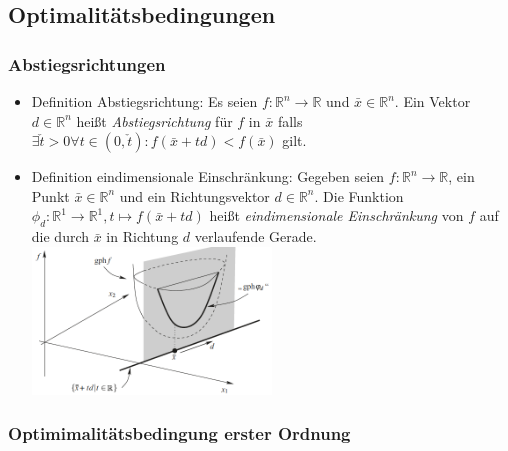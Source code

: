 \documentclass[paper=a4, fontsize=11pt]{scrartcl} %
\numberwithin{equation}{section} %
\numberwithin{figure}{section} %
\numberwithin{table}{section} %
\begin{document}
\subsection{Optimalitätsbedingungen}

\subsubsection{Abstiegsrichtungen}

\begin{itemize}
\item Definition Abstiegsrichtung: Es seien $f: \mathbb{R}^n \rightarrow \mathbb{R}$ und $\bar{x} \in \mathbb{R}^n$. Ein Vektor $d \in \mathbb{R}^n$ heißt \textit{Abstiegsrichtung} für $f$ in $\bar{x}$ falls $\exists \check{t} > 0 \forall t \in (0, \check{t}): f(\bar{x} + td) < f(\bar{x})$ gilt.
\item Definition eindimensionale Einschränkung: Gegeben seien $f: \mathbb{R}^n \rightarrow \mathbb{R}$, ein Punkt $\bar{x} \in \mathbb{R}^n$ und ein Richtungsvektor $d \in \mathbb{R}^n$. Die Funktion $\phi_d : \mathbb{R}^1 \rightarrow \mathbb{R}^1, t 	\mapsto f(\bar{x} + td)$ heißt \textit{eindimensionale Einschränkung} von $f$ auf die durch $\bar{x}$ in Richtung $d$ verlaufende Gerade.\\
\includegraphics[width=0.5\textwidth]{imgs/eindimeinschr}
\end{itemize}

\subsubsection{Optimimalitätsbedingung erster Ordnung}
\end{document}
